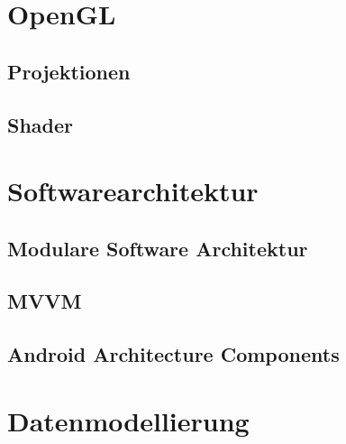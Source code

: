 
\section{OpenGL}
\label{chap:OpenGL}
\subsection{Projektionen}
\subsection{Shader}

\section{Softwarearchitektur}
\label{chap:Softwarearchitektur}
\subsection{Modulare Software Architektur}
\label{chap:Modulare Software Architektur}
\subsection{MVVM}
\subsection{Android Architecture Components}



\section{Datenmodellierung}
\label{chap:Datenmodellierung}